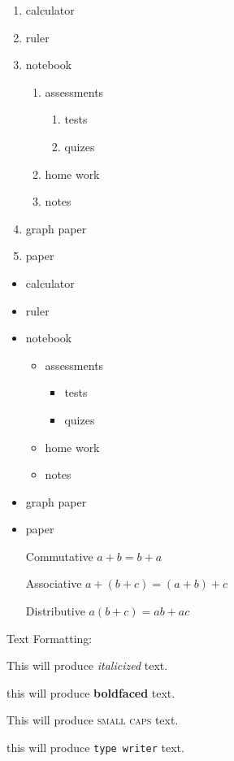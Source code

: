 \documentclass[11pt]{article}
\begin{document}
\begin{enumerate}
\item calculator
\item ruler
\item notebook
	\begin{enumerate}
	\item assessments
		\begin{enumerate}
		\item tests
		\item quizes
		\end{enumerate}
	\item home work
	\item notes
	\end{enumerate}
\item graph paper
\item paper
\end{enumerate}

\begin{itemize}
\item calculator
\item ruler
\item notebook
	\begin{itemize}
	\item assessments
		\begin{itemize}
		\item tests
		\item quizes
		\end{itemize}
	\item home work
	\item notes
	\end{itemize}
\item graph paper
\item paper
\end{itemize}

\begin{enumerate}
\item[Commutative] $a+b = b+a$
\item[Associative] $a+(b+c) = (a+b)+c$
\item[Distributive] $a(b+c) = ab + ac$
\end{enumerate}

Text Formatting:

This will produce \textit{italicized} text.

this will produce \textbf{boldfaced} text.

This will produce \textsc{small caps} text.

this will produce \texttt{type writer} text.
\end{document}
